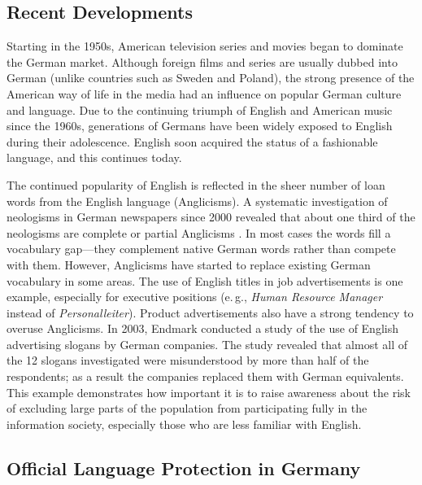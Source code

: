 \begin{multicols}{2}

\subsection{Recent Developments}

Starting in the 1950s, American television series and movies began to dominate the German market. Although foreign films and series are usually dubbed into German (unlike countries such as Sweden and Poland), the strong presence of the American way of life in the media had an influence on popular German culture and language. Due to the continuing triumph of English and American music since the 1960s, generations of Germans have been widely exposed to English during their adolescence. English soon acquired the status of a fashionable language, and this continues today.

The continued popularity of English is reflected in the sheer number of loan words from the English language (Anglicisms). A systematic investigation of neologisms in German newspapers since 2000 revealed that about one third of the neologisms are complete or partial Anglicisms \cite{Lemni1}. In most cases the words fill a vocabulary gap—they complement native German words rather than compete with them. However, Anglicisms have started to replace existing German vocabulary in some areas. The use of English titles in job advertisements is one example, especially for executive positions (e.\,g., \textit{Human Resource Manager} instead of \textit{Personalleiter}). Product advertisements also have a strong tendency to overuse Anglicisms. In 2003, Endmark conducted a study of the use of English advertising slogans by German companies. The study revealed that almost all of the 12 slogans investigated were misunderstood by more than half of the respondents; as a result the companies replaced them with German equivalents. This example demonstrates how important it is to raise awareness about the risk of excluding large parts of the population from participating fully in the information society, especially those who are less familiar with English.

\subsection{Official Language Protection in Germany}


\end{multicols}
